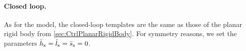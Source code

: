 
\paragraph{Closed loop.}
As for the model, the closed-loop templates are the same as those of the planar rigid body from \autoref{sec:CtrlPlanarRigidBody}.
For symmetry reasons, we set the parameters $\bar{h}_{\mathsf{x}}=\bar{l}_{\mathsf{x}}=\bar{s}_{\mathsf{x}}=0$.
